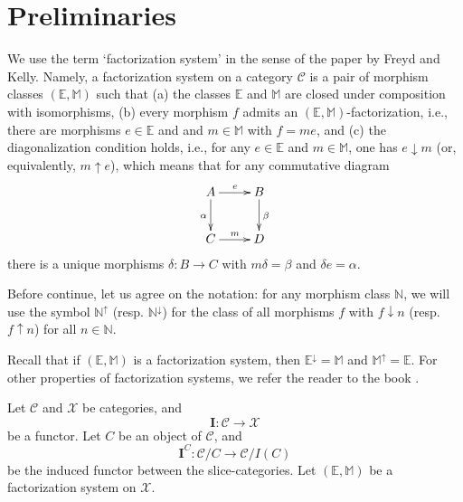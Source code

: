 \documentclass[12pt,reqno,intlim]{amsart}
\numberwithin{equation}{section}
\theoremstyle{definition}
\theoremstyle{remark}
\begin{document}
\section{Preliminaries}
We use the term `factorization system' in the sense of the paper \cite{FK} by Freyd and Kelly. Namely, a factorization
system on a category $\mathcal{C}$ is a pair of morphism classes $(\mathbb{E},\mathbb{M})$ such that (a) the classes
$\mathbb{E}$ and $\mathbb{M}$ are closed under composition with isomorphisms, (b) every morphism $f$ admits an $(\mathbb{E},\mathbb{M})$-factorization, i.e., there are morphisms $e\in \mathbb{E}$ and 
and $m\in \mathbb{M}$  with $f=me$, and (c) the diagonalization condition holds, i.e., for any $e\in \mathbb{E}$ and $m\in \mathbb{M}$, one has $e\downarrow  m$ (or, equivalently, $m\uparrow e$), which means that for any commutative diagram 
\begin{equation}
\xymatrix{A\ar[r]^{e}\ar[d]_{\alpha}&B\ar[d]^{\beta}\\
C\ar[r]^{m}&D}
\end{equation}
there is a unique morphisms $\delta:B\rightarrow C$ with $m\delta=\beta$ and $\delta e=\alpha$.

Before continue, let us agree on the notation: for any morphism class $\mathbb{N}$, we will use the symbol $\mathbb{N}^{\uparrow}$ (resp. $\mathbb{N}^{\downarrow}$) for the class of all morphisms $f$ with $f \downarrow n$  (resp. $f \uparrow n$) for all $n\in \mathbb{N}$.

Recall that if $(\mathbb{E},\mathbb{M})$ is a factorization system, then $\mathbb{E}^{\downarrow}=\mathbb{M}$ and $\mathbb{M}^{\uparrow}=\mathbb{E}$. For other properties of factorization systems, we refer the reader to the book \cite{B2}.

Let $\mathcal{C}$ and $\mathcal{X}$ be categories, and 
\begin{equation} \label{2.2}
\mathbf{I}:\mathcal{C}\rightarrow \mathcal{X}
\end{equation}
be a functor. Let $C$ be an object of $\mathcal{C}$, and
\begin{equation}
\mathbf{I}^C:\mathcal{C}/C\rightarrow \mathcal{C}/I(C)
\end{equation}
be the induced functor between the slice-categories. Let
$(\mathbb{E},\mathbb{M})$ be a factorization system on $\mathcal{X}$. 
\end{document}
